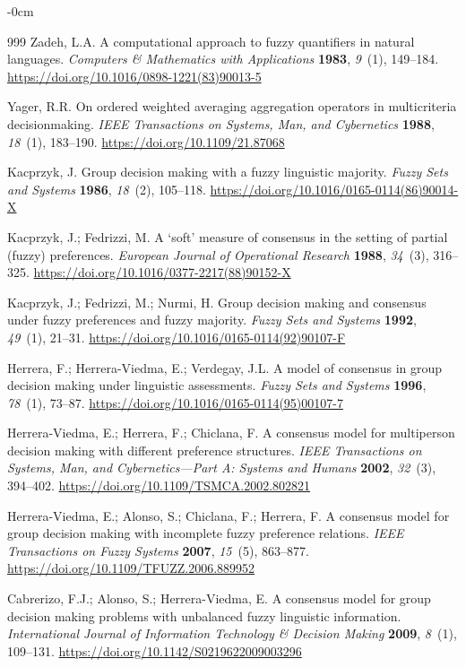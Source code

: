 \documentclass[smartcities,article,submit,moreauthors]{Definitions/mdpi}
\begin{document}
\begin{adjustwidth}{-\extralength}{0cm}
\begin{thebibliography}{999}
Zadeh, L.A. A computational approach to fuzzy quantifiers in natural
languages. \emph{Computers \& Mathematics with Applications} \textbf{1983},
\emph{9}~(1), 149--184.
\url{https://doi.org/10.1016/0898-1221(83)90013-5}

Yager, R.R. On ordered weighted averaging aggregation operators in
multicriteria decisionmaking. \emph{IEEE Transactions on Systems, Man, and
Cybernetics} \textbf{1988}, \emph{18}~(1), 183--190.
\url{https://doi.org/10.1109/21.87068}

Kacprzyk, J. Group decision making with a fuzzy linguistic majority.
\emph{Fuzzy Sets and Systems} \textbf{1986}, \emph{18}~(2), 105--118.
\url{https://doi.org/10.1016/0165-0114(86)90014-X}

Kacprzyk, J.; Fedrizzi, M. A `soft' measure of consensus in the setting of
partial (fuzzy) preferences. \emph{European Journal of Operational Research}
\textbf{1988}, \emph{34}~(3), 316--325.
\url{https://doi.org/10.1016/0377-2217(88)90152-X}

Kacprzyk, J.; Fedrizzi, M.; Nurmi, H. Group decision making and consensus
under fuzzy preferences and fuzzy majority. \emph{Fuzzy Sets and Systems}
\textbf{1992}, \emph{49}~(1), 21--31.
\url{https://doi.org/10.1016/0165-0114(92)90107-F}

Herrera, F.; Herrera-Viedma, E.; Verdegay, J.L. A model of consensus in group
decision making under linguistic assessments. \emph{Fuzzy Sets and Systems}
\textbf{1996}, \emph{78}~(1), 73--87.
\url{https://doi.org/10.1016/0165-0114(95)00107-7}

Herrera-Viedma, E.; Herrera, F.; Chiclana, F. A consensus model for
multiperson decision making with different preference structures. \emph{IEEE
Transactions on Systems, Man, and Cybernetics---Part A: Systems and Humans}
\textbf{2002}, \emph{32}~(3), 394--402.
\url{https://doi.org/10.1109/TSMCA.2002.802821}

Herrera-Viedma, E.; Alonso, S.; Chiclana, F.; Herrera, F. A consensus model
for group decision making with incomplete fuzzy preference relations.
\emph{IEEE Transactions on Fuzzy Systems} \textbf{2007}, \emph{15}~(5),
863--877.
\url{https://doi.org/10.1109/TFUZZ.2006.889952}

Cabrerizo, F.J.; Alonso, S.; Herrera-Viedma, E. A consensus model for group
decision making problems with unbalanced fuzzy linguistic information.
\emph{International Journal of Information Technology \& Decision Making}
\textbf{2009}, \emph{8}~(1), 109--131.
\url{https://doi.org/10.1142/S0219622009003296}


\end{thebibliography}
\end{adjustwidth}
\end{document}
